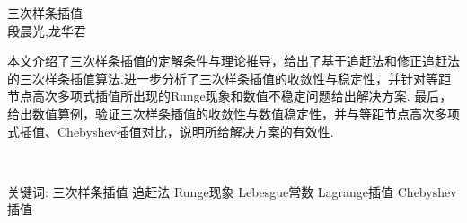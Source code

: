 \documentclass[12pt]{article}
\begin{document}
\vspace*{0.4cm}
\begin{center}
{
{\LARGE\heiti 三次样条插值}}\\[0.6cm]
{\normalsize 段晨光,\quad 龙华君}\\[0.1cm]
\end{center}
{\small
{}%
\parbox[t]{13.3cm}{ 
本文介绍了三次样条插值的定解条件与理论推导，给出了基于追赶法和修正追赶法的三次样条插值算法.进一步分析了三次样条插值的收敛性与稳定性，并针对等距节点高次多项式插值所出现的Runge现象和数值不稳定问题给出解决方案. 最后，给出数值算例，验证三次样条插值的收敛性与数值稳定性，并与等距节点高次多项式插值、Chebyshev插值对比，说明所给解决方案的有效性. }\\}	

{\small }	

{\small
\noindent
{\heiti 关键词:} { 三次样条插值} { 追赶法} { Runge现象} { Lebesgue常数} { Lagrange插值} { Chebyshev插值}}	
\end{document}
